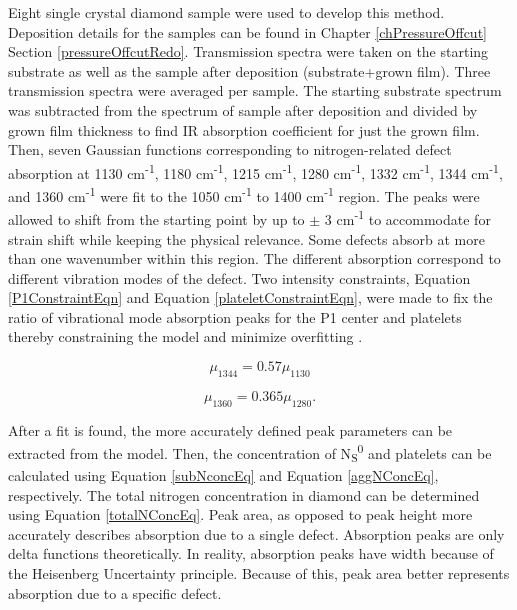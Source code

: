 Eight single crystal diamond sample were used to develop this method. Deposition details for the samples can be found in Chapter \ref{chPressureOffcut} Section \ref{pressureOffcutRedo}. Transmission spectra were taken on the starting substrate as well as the sample after deposition (substrate+grown film). Three transmission spectra were averaged per sample. The starting substrate spectrum was subtracted from the spectrum of sample after deposition and divided by grown film thickness to find IR absorption coefficient for just the grown film. Then, seven Gaussian functions corresponding to nitrogen-related defect absorption at 1130 cm\textsuperscript{-1}, 1180 cm\textsuperscript{-1}, 1215 cm\textsuperscript{-1}, 1280 cm\textsuperscript{-1}, 1332 cm\textsuperscript{-1}, 1344 cm\textsuperscript{-1}, and 1360 cm\textsuperscript{-1} were fit to the 1050 cm\textsuperscript{-1} to 1400 cm\textsuperscript{-1} region. The peaks were allowed to shift from the starting point by up to $\pm$ 3 cm\textsuperscript{-1} to accommodate for strain shift while keeping the physical relevance. Some defects absorb at more than one wavenumber within this region. The different absorption correspond to different vibration modes of the defect. Two intensity constraints, Equation \ref{P1ConstraintEqn} and Equation \ref{plateletConstraintEqn}, were made to fix the ratio of vibrational mode absorption peaks for the P1 center and platelets thereby constraining the model and minimize overfitting \cite{Lawson1998OnDiamond, Woods1986PlateletsDiamonds}.

\begin{equation}
    \mu_{1344}=0.57\mu_{1130}
    \label{P1ConstraintEqn}
\end{equation}

\begin{equation}
    \mu_{1360}=0.365\mu_{1280}.
    \label{plateletConstraintEqn}
\end{equation}

After a fit is found, the more accurately defined peak parameters can be extracted from the model. Then, the concentration of N\textsubscript{S}\textsuperscript{0} and platelets can be calculated using Equation \ref{subNconcEq} and Equation \ref{aggNConcEq}, respectively. The total nitrogen concentration in diamond can be determined using Equation \ref{totalNConcEq}. Peak area, as opposed to peak height more accurately describes absorption due to a single defect. Absorption peaks are only delta functions theoretically. In reality, absorption peaks have width because of the Heisenberg Uncertainty principle. Because of this, peak area better represents absorption due to a specific defect. 

